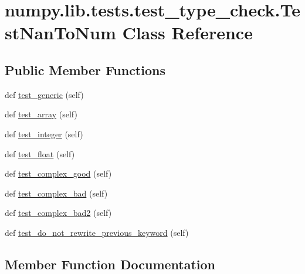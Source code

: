 \hypertarget{classnumpy_1_1lib_1_1tests_1_1test__type__check_1_1TestNanToNum}{}\section{numpy.\+lib.\+tests.\+test\+\_\+type\+\_\+check.\+Test\+Nan\+To\+Num Class Reference}
\label{classnumpy_1_1lib_1_1tests_1_1test__type__check_1_1TestNanToNum}
\subsection*{Public Member Functions}
\begin{DoxyCompactItemize}
\item 
def \hyperlink{classnumpy_1_1lib_1_1tests_1_1test__type__check_1_1TestNanToNum_a6f945721069de466105e55ba275e25d2}{test\+\_\+generic} (self)
\item 
def \hyperlink{classnumpy_1_1lib_1_1tests_1_1test__type__check_1_1TestNanToNum_a85a6c0efb38fd51e5a0cfc89d8dcf1b6}{test\+\_\+array} (self)
\item 
def \hyperlink{classnumpy_1_1lib_1_1tests_1_1test__type__check_1_1TestNanToNum_a84f3fd9d2dfb8fa2ddcdc930ff426f06}{test\+\_\+integer} (self)
\item 
def \hyperlink{classnumpy_1_1lib_1_1tests_1_1test__type__check_1_1TestNanToNum_a06c2449423c6de849c60b937fe4bdab1}{test\+\_\+float} (self)
\item 
def \hyperlink{classnumpy_1_1lib_1_1tests_1_1test__type__check_1_1TestNanToNum_aeaf997bb90a14792d4aa05377d8f278e}{test\+\_\+complex\+\_\+good} (self)
\item 
def \hyperlink{classnumpy_1_1lib_1_1tests_1_1test__type__check_1_1TestNanToNum_a5910d364484bdcdb550d12c1a5cb7e9c}{test\+\_\+complex\+\_\+bad} (self)
\item 
def \hyperlink{classnumpy_1_1lib_1_1tests_1_1test__type__check_1_1TestNanToNum_ae7bee6e6ed4a3b74645980e001776ea5}{test\+\_\+complex\+\_\+bad2} (self)
\item 
def \hyperlink{classnumpy_1_1lib_1_1tests_1_1test__type__check_1_1TestNanToNum_a5ce6fca7406681f118f77231fac56ab0}{test\+\_\+do\+\_\+not\+\_\+rewrite\+\_\+previous\+\_\+keyword} (self)
\end{DoxyCompactItemize}


\subsection{Member Function Documentation}
\mbox{\label{classnumpy_1_1lib_1_1tests_1_1test__type__check_1_1TestNanToNum_a85a6c0efb38fd51e5a0cfc89d8dcf1b6}} 
